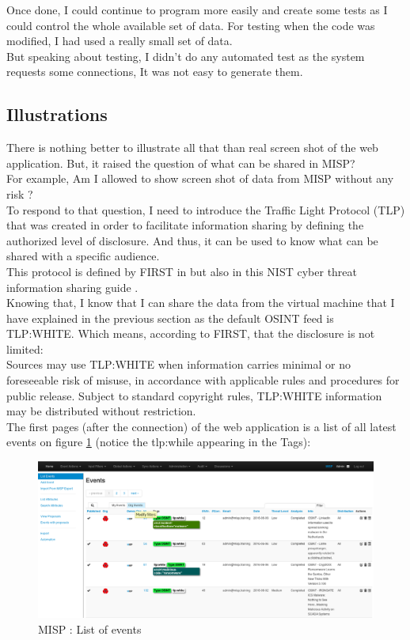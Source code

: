 \documentclass{eplmastersthesis}
\begin{document}
Once done, I could continue to program more easily and create some tests as I could control the whole available set of data. For testing when the code was modified, I had used a really small set of data. \\
But speaking about testing, I didn't do any automated test as the system requests some connections, It was not easy to generate them. 

\subsection{Illustrations}
There is nothing better to illustrate all that than real screen shot of the web application. But, it raised the question of what can be shared in MISP?\\
For example, Am I allowed to show screen shot of data from MISP without any risk ?\\
To respond to that question, I need to introduce the Traffic Light Protocol (TLP) that was created in order to facilitate information sharing by defining the authorized level of disclosure. And thus, it can be used to know what can be shared with a specific audience.\\
This protocol is defined by FIRST in \cite{FirstTLP} but also in this NIST cyber threat information sharing guide \cite{johnson2016guide}.\\

Knowing that, I know that I can share the data from the virtual machine that I have explained in the previous section as the default OSINT feed is TLP:WHITE. Which means, according to FIRST, that the disclosure is not limited: \\
Sources may use TLP:WHITE when information carries minimal or no foreseeable risk of misuse, in accordance with applicable rules and procedures for public release. Subject to standard copyright rules, TLP:WHITE information may be distributed without restriction.\\

The first pages (after the connection) of the web application is a list of all latest events on figure \ref{webevents} (notice the tlp:while appearing in the Tags):

\begin{figure}[!h]
	\begin{center}
		\includegraphics[scale=0.32]{res/webEvents}
		\caption{MISP : List of events}
		\label{webevents}
	\end{center}
\end{figure}
\end{document}
